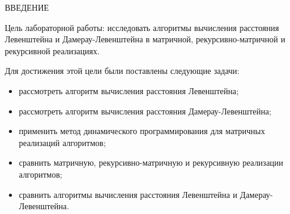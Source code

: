 \begin{center}
    \MakeUppercase{\large Введение}
\end{center}

Цель лабораторной работы: исследовать алгоритмы вычисления расстояния Левенштейна и Дамерау-Левенштейна в матричной, рекурсивно-матричной и рекурсивной реализациях.

\vspace{0.25cm}
Для достижения этой цели были поставлены следующие задачи:

\begin{itemize}

\item рассмотреть алгоритм вычисления расстояния Левенштейна;

\item рассмотреть алгоритм вычисления расстояния Дамерау-Левенштейна;

\item применить метод динамического программирования для матричных реализаций алгоритмов;

\item сравнить матричную, рекурсивно-матричную и рекурсивную реализации алгоритмов;

\item сравнить алгоритмы вычисления расстояния Левенштейна и Дамерау-Левенштейна.

\end{itemize}

\newpage